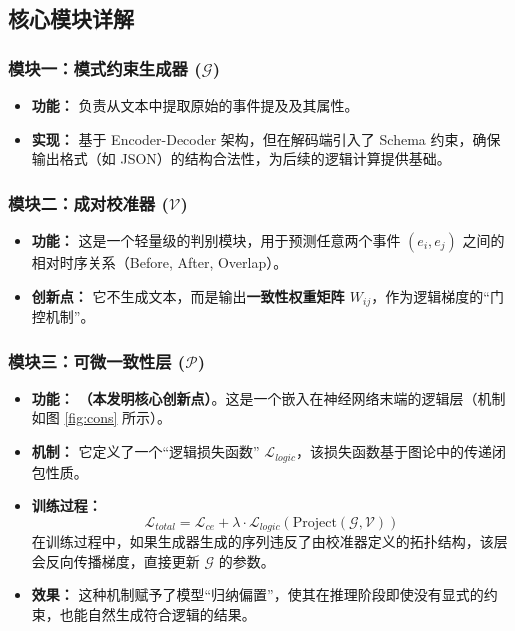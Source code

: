 \documentclass[a4paper,12pt]{article}
\begin{document}
\subsection{核心模块详解}

\subsubsection{模块一：模式约束生成器 ($\mathcal{G}$)}
\begin{itemize}
    \item \textbf{功能：} 负责从文本中提取原始的事件提及及其属性。
    \item \textbf{实现：} 基于 Encoder-Decoder 架构，但在解码端引入了 Schema 约束，确保输出格式（如 JSON）的结构合法性，为后续的逻辑计算提供基础。
\end{itemize}

\subsubsection{模块二：成对校准器 ($\mathcal{V}$)}
\begin{itemize}
    \item \textbf{功能：} 这是一个轻量级的判别模块，用于预测任意两个事件 $(e_i, e_j)$ 之间的相对时序关系（Before, After, Overlap）。
    \item \textbf{创新点：} 它不生成文本，而是输出\textbf{一致性权重矩阵 $W_{ij}$}，作为逻辑梯度的“门控机制”。
\end{itemize}

\subsubsection{模块三：可微一致性层 ($\mathcal{P}$)}
\begin{itemize}
    \item \textbf{功能：} \textbf{（本发明核心创新点）}。这是一个嵌入在神经网络末端的逻辑层（机制如图 \ref{fig:cons} 所示）。
    \item \textbf{机制：} 它定义了一个“逻辑损失函数” $\mathcal{L}_{logic}$，该损失函数基于图论中的传递闭包性质。
    \item \textbf{训练过程：}
        \begin{equation}
           \mathcal{L}_{total} = \mathcal{L}_{ce} + \lambda \cdot \mathcal{L}_{logic}(\text{Project}(\mathcal{G}, \mathcal{V}))
        \end{equation}
        在训练过程中，如果生成器生成的序列违反了由校准器定义的拓扑结构，该层会反向传播梯度，直接更新 $\mathcal{G}$ 的参数。
    \item \textbf{效果：} 这种机制赋予了模型“归纳偏置”，使其在推理阶段即使没有显式的约束，也能自然生成符合逻辑的结果。
\end{itemize}
\end{document}
